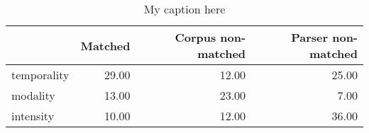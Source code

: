 \begin{table}[!ht]
\centering
\begin{tabular}{lrrr}
\toprule
{} &  Matched &  Corpus non-matched &  Parser non-matched \\
\midrule
temporality &    29.00 &               12.00 &               25.00 \\
modality    &    13.00 &               23.00 &                7.00 \\
intensity   &    10.00 &               12.00 &               36.00 \\
\bottomrule
\end{tabular}
\caption{My caption here}
\label{tab:MOOD_ASSESMENT-ocd-data}
\end{table}